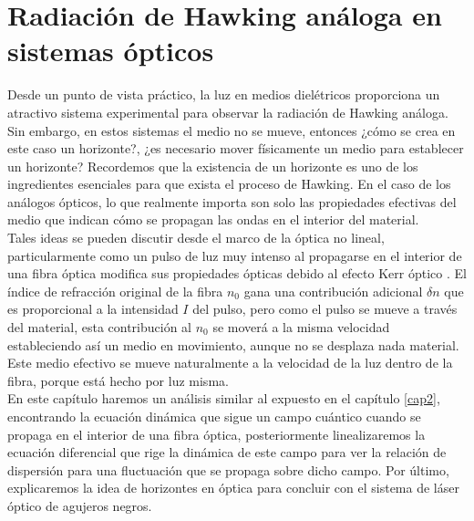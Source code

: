 \chapter{Radiaci\'{o}n de Hawking an\'{a}loga en sistemas \'{o}pticos}\label{cap4}
Desde un punto de vista práctico, la luz en medios diel\'{e}tricos proporciona un atractivo sistema experimental para observar la radiación de Hawking an\'{a}loga. Sin embargo, en estos sistemas el medio no se mueve, entonces ¿c\'{o}mo se crea en este caso un horizonte?, ¿es necesario mover físicamente un medio para establecer un horizonte? Recordemos que la existencia de un horizonte es uno de los ingredientes esenciales para que exista el proceso de Hawking. En el caso de los an\'{a}logos \'{o}pticos, lo que realmente importa son solo las propiedades efectivas del medio que indican c\'omo se propagan las ondas en el interior del material.\\

Tales ideas se pueden discutir desde el marco de la \'{o}ptica no lineal, particularmente como un pulso de luz muy intenso al propagarse en el interior de una fibra \'{o}ptica modifica sus propiedades ópticas debido al efecto Kerr \'{o}ptico \citep{Agrawal2013}. El índice de refracción original de la fibra $n_{0}$ gana una contribución adicional $\delta n$ que es proporcional a la intensidad $I$ del pulso, pero como el pulso se mueve a trav\'{e}s del material, esta contribución al $n_{0}$ se mover\'{a} a la misma velocidad estableciendo así un medio en movimiento, aunque no se desplaza nada material. Este medio efectivo se mueve naturalmente a la velocidad de la luz dentro de la fibra, porque está hecho por luz misma.\\

En este cap\'{i}tulo haremos un an\'{a}lisis similar al expuesto en el cap\'{i}tulo \ref{cap2}, encontrando la ecuaci\'{o}n din\'{a}mica que sigue un campo cu\'{a}ntico cuando se propaga en el interior de una fibra \'{o}ptica, posteriormente linealizaremos la ecuaci\'{o}n diferencial que rige la din\'{a}mica de este campo para ver la relaci\'{o}n de dispersi\'{o}n para una fluctuaci\'{o}n que se propaga sobre dicho campo. Por \'{u}ltimo, explicaremos la idea de horizontes en \'{o}ptica para concluir con el sistema de l\'{a}ser \'{o}ptico de agujeros negros.

